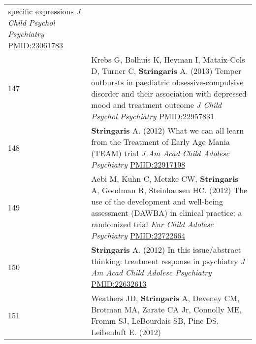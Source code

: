 \documentclass[
]{article}
\begin{document}
\begin{longtable}[]{@{}ll@{}}
\begin{minipage}[t]{0.94\columnwidth}
specific expressions \emph{J Child Psychol Psychiatry}
\url{PMID:23061783}\strut
\end{minipage}\tabularnewline
\begin{minipage}[t]{0.01\columnwidth}\raggedright
147\strut
\end{minipage} & \begin{minipage}[t]{0.94\columnwidth}\raggedright
Krebs G, Bolhuis K, Heyman I, Mataix-Cols D, Turner C,
\textbf{Stringaris} A. (2013) Temper outbursts in paediatric
obsessive-compulsive disorder and their association with depressed mood
and treatment outcome \emph{J Child Psychol Psychiatry}
\url{PMID:22957831}\strut
\end{minipage}\tabularnewline
\begin{minipage}[t]{0.01\columnwidth}\raggedright
148\strut
\end{minipage} & \begin{minipage}[t]{0.94\columnwidth}\raggedright
\textbf{Stringaris} A. (2012) What we can all learn from the Treatment
of Early Age Mania (TEAM) trial \emph{J Am Acad Child Adolesc
Psychiatry} \url{PMID:22917198}\strut
\end{minipage}\tabularnewline
\begin{minipage}[t]{0.01\columnwidth}\raggedright
149\strut
\end{minipage} & \begin{minipage}[t]{0.94\columnwidth}\raggedright
Aebi M, Kuhn C, Metzke CW, \textbf{Stringaris} A, Goodman R, Steinhausen
HC. (2012) The use of the development and well-being assessment (DAWBA)
in clinical practice: a randomized trial \emph{Eur Child Adolesc
Psychiatry} \url{PMID:22722664}\strut
\end{minipage}\tabularnewline
\begin{minipage}[t]{0.01\columnwidth}\raggedright
150\strut
\end{minipage} & \begin{minipage}[t]{0.94\columnwidth}\raggedright
\textbf{Stringaris} A. (2012) In this issue/abstract thinking: treatment
response in psychiatry \emph{J Am Acad Child Adolesc Psychiatry}
\url{PMID:22632613}\strut
\end{minipage}\tabularnewline
\begin{minipage}[t]{0.01\columnwidth}\raggedright
151\strut
\end{minipage} & \begin{minipage}[t]{0.94\columnwidth}\raggedright
Weathers JD, \textbf{Stringaris} A, Deveney CM, Brotman MA, Zarate CA
Jr, Connolly ME, Fromm SJ, LeBourdais SB, Pine DS, Leibenluft E. (2012)

\end{minipage}
\end{longtable}
\end{document}

